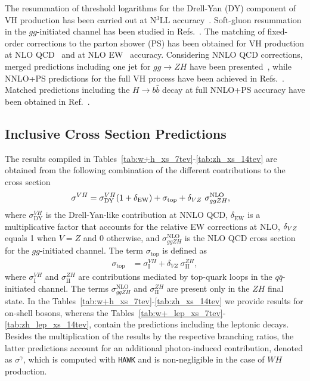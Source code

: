 The resummation of threshold logarithms for the Drell-Yan (DY) component of VH production has been carried out at N$^3$LL accuracy~\cite{Kumar:2014uwa, Das:2022zie}. Soft-gluon resummation in the $gg$-initiated channel has been studied in Refs.~\cite{Harlander:2014wda,Das:2025wbj,Das:2025qym, Banerjee:2026hzp}. The matching of fixed-order corrections to the parton shower (PS) has been obtained for VH production at NLO QCD~\cite{Luisoni:2013cuh,Granata:2017iod} and at NLO EW~\cite{Granata:2017iod} accuracy. Considering NNLO QCD corrections, merged predictions including one jet for $gg \to ZH$ have been presented~\cite{Hespel:2015zea, Goncalves:2015mfa}, while NNLO+PS predictions for the full VH process have been achieved in Refs.~\cite{Astill:2016hpa,Astill:2018ivh, Alioli:2019qzz}. Matched predictions including the $H\to b \bar{b}$ decay at full NNLO+PS accuracy have been obtained in Ref.~\cite{Zanoli:2021iyp}.

\subsection{Inclusive Cross Section Predictions}
\label{sec:vh_inclxs_breakdown}

The results compiled in Tables~\ref{tab:w+h_xs_7tev}-\ref{tab:zh_xs_14tev} are obtained from the following combination of the different contributions to the cross section
\begin{align}
    \sigma^{VH} &= \sigma_\mathrm{DY}^{VH}(1+ \delta_\mathrm{EW})+ \sigma_\text{top} + \delta_{\tiny VZ}~\sigma^\mathrm{NLO}_{ggZH},
    \label{eq:sigma_vh_breakdown}
\end{align}
where $\sigma_\mathrm{DY}^{VH}$ is the Drell-Yan-like contribution at NNLO QCD, $\delta_\mathrm{EW}$ is a multiplicative factor that accounts for the relative EW corrections at NLO, $\delta_{\tiny VZ}$ equals 1 when $V=Z$ and 0 otherwise, and $\sigma^\mathrm{NLO}_{ggZH}$ is the NLO QCD cross section for the $gg$-initiated channel. The term $\sigma_\text{top}$ is defined as
\begin{align}
     \sigma_\text{top} &= \sigma_\mathrm{I}^{VH} + \delta_{VZ}~\sigma_\mathrm{II}^{ZH},
\end{align}
where $\sigma_\mathrm{I}^{VH}$ and $\sigma_\mathrm{II}^{ZH}$ are contributions mediated by top-quark loops in the $q\bar{q}$-initiated channel.
The terms $\sigma^\mathrm{NLO}_{ggZH}$ and $\sigma_\mathrm{II}^{ZH}$  are present only in the $ZH$ final state. In the Tables~\ref{tab:w+h_xs_7tev}-\ref{tab:zh_xs_14tev} we provide results for on-shell bosons, whereas the Tables~\ref{tab:w+_lep_xs_7tev}-\ref{tab:zh_lep_xs_14tev}, contain the predictions including the leptonic decays. Besides the multiplication of the results by the respective branching ratios, the latter predictions account for an additional photon-induced contribution, denoted as $\sigma^\gamma$, which is computed with \texttt{HAWK} and is non-negligible in the case of $WH$ production.

